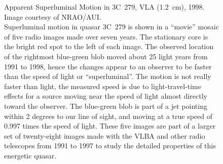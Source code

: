 \documentclass[10pt,a4paper,english]{article}
\begin{document}
\begin{figure}[!ht]
\begin{minipage}{.4\textwidth}
{            Apparent Superluminal Motion in 3C~279, VLA (\SI{1.2}{\cm}), 1998.
            Image courtesy of NRAO/AUI.\vspace{1ex}\\
            Superluminal motion in quasar 3C~279 is shown in a “movie” mosaic of
            five radio images made over seven years. The stationary core is the
            bright red spot to the left of each image. The observed location of
            the rightmost blue-green blob moved about 25 light years from 1991
            to 1998, hence the changes appear to an observer to be faster than
            the speed of light or “superluminal”. The motion is not really
            faster than light, the measured speed is due to light-travel-time
            effects for a source moving near the speed of light almost directly
            toward the observer. The blue-green blob is part of a jet pointing
            within 2 degrees to our line of sight, and moving at a true speed
            of 0.997 times the speed of light. These five images are part of a
            larger set of twenty-eight images made with the VLBA and other
            radio telescopes from 1991 to 1997 to study the detailed properties
            of this energetic quasar.
        }
    \end{minipage}
\end{figure}
\end{document}
